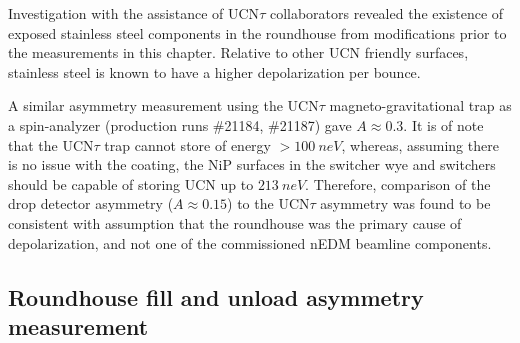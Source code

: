 Investigation with the assistance of UCN$\tau$ collaborators revealed the existence of exposed stainless steel components in the roundhouse from modifications prior to the measurements in this chapter. Relative to other UCN friendly surfaces, stainless steel is known to have a higher depolarization per bounce. 

A similar asymmetry measurement using the UCN$\tau$ magneto-gravitational trap as a spin-analyzer (production runs \#21184, \#21187) gave $A\approx 0.3$. It is of note that the UCN$\tau$ trap cannot store \ucn of energy $>\qty{100}{neV}$, whereas, assuming there is no issue with the coating, the NiP surfaces in the switcher wye and switchers should be capable of storing UCN up to $\qty{213}{neV}$. Therefore, comparison of the drop detector asymmetry ($A\approx 0.15$) to the UCN$\tau$ asymmetry was found to be consistent with assumption that the roundhouse was the primary cause of depolarization, and not one of the commissioned nEDM beamline components.



\subsection{Roundhouse fill and unload asymmetry measurement}


